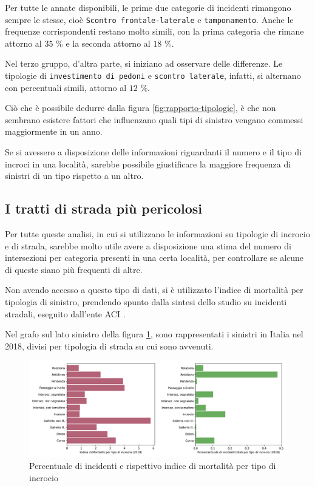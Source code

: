 \documentclass[a4paper,12pt]{report}
\newcommand{\columnstyle}[1]{\texttt{#1}}
\begin{document}
Per tutte le annate disponibili, le prime due categorie di incidenti rimangono sempre 
le stesse, cioè \columnstyle{Scontro frontale-laterale} e \columnstyle{tamponamento}. 
Anche le frequenze corrispondenti restano molto simili, con la prima 
categoria che rimane attorno al $35$ \% e la seconda attorno al $18$ \%. 

Nel terzo gruppo, d'altra parte, si iniziano ad osservare delle differenze. 
Le tipologie di \columnstyle{investimento di pedoni} e \columnstyle{scontro laterale}, 
infatti, si alternano con percentuali simili, attorno al $12$ \%. 

Ciò che è possibile dedurre dalla figura \ref{fig:rapporto-tipologie}, è che non 
sembrano esistere fattori che influenzano quali tipi di sinistro 
vengano commessi maggiormente in un anno. 

Se si avessero a disposizione delle informazioni riguardanti il numero e il tipo 
di incroci in una località, sarebbe possibile giustificare 
la maggiore frequenza di sinistri di un tipo rispetto a un altro. 

\subsection{I tratti di strada più pericolosi}

Per tutte queste analisi, in cui si utilizzano le informazioni su tipologie 
di incrocio e di strada, 
sarebbe molto utile avere a disposizione una stima del numero di intersezioni 
per categoria presenti in una certa località, 
per controllare se alcune di queste siano più frequenti di altre. 

Non avendo accesso a questo tipo di dati, si è utilizzato l'indice di 
mortalità per tipologia di sinistro, prendendo spunto dalla sintesi dello 
studio su incidenti stradali, eseguito dall'ente ACI \cite{ACI:2}. 

Nel grafo sul lato sinistro della figura \ref{fig:tipo-intersezioni}, 
sono rappresentati i sinistri in Italia nel 2018, divisi per tipologia 
di strada su cui sono avvenuti. 

\begin{figure}
    \includegraphics[width=\linewidth]{img_unite/intersezioni_indice_mortalita.png}
    \caption{Percentuale di incidenti e rispettivo indice di mortalità per tipo di incrocio}
    \label{fig:tipo-intersezioni}
\end{figure}
\end{document}
